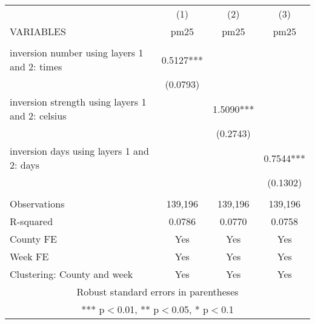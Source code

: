 \begin{tabular}{lccc} \hline
 & (1) & (2) & (3) \\
VARIABLES & pm25 & pm25 & pm25 \\ \hline
 &  &  &  \\
inversion number using layers 1 and 2: times & 0.5127*** &  &  \\
 & (0.0793) &  &  \\
inversion strength using layers 1 and 2: celsius &  & 1.5090*** &  \\
 &  & (0.2743) &  \\
inversion days using layers 1 and 2: days &  &  & 0.7544*** \\
 &  &  & (0.1302) \\
 &  &  &  \\
Observations & 139,196 & 139,196 & 139,196 \\
R-squared & 0.0786 & 0.0770 & 0.0758 \\
County FE & Yes & Yes & Yes \\
Week FE & Yes & Yes & Yes \\
 Clustering: County and week & Yes & Yes & Yes \\ \hline
\multicolumn{4}{c}{ Robust standard errors in parentheses} \\
\multicolumn{4}{c}{ *** p$<$0.01, ** p$<$0.05, * p$<$0.1} \\
\end{tabular}
